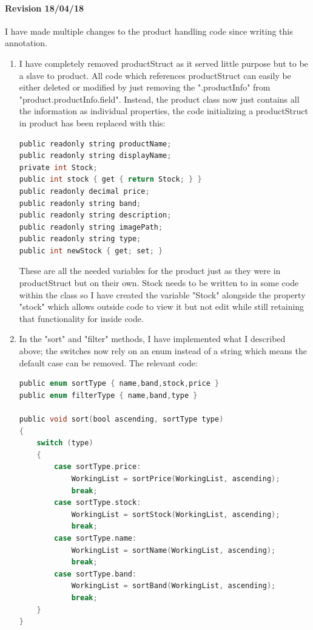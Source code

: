 ﻿\documentclass{article}
\begin{document}
    \paragraph{Revision 18/04/18}
    I have made multiple changes to the product handling code since writing this annotation.
    \begin{enumerate}
        \item I have completely removed productStruct as it served little purpose but to be a slave to product.
        All code which references productStruct can easily be either deleted or modified by just removing the ".productInfo" from "product.productInfo.field".
        Instead, the product class now just contains all the information as individual properties, the code initializing a productStruct in product has been replaced with this:
        \begin{lstlisting}[language=C]
public readonly string productName;
public readonly string displayName;
private int Stock;
public int stock { get { return Stock; } }
public readonly decimal price;
public readonly string band;
public readonly string description;
public readonly string imagePath;
public readonly string type;
public int newStock { get; set; }
        \end{lstlisting}
        These are all the needed variables for the product just as they were in productStruct but on their own.
        Stock needs to be written to in some code within the class so I have created the variable "Stock" alongside the property "stock" which allows outside code to view it but not edit while still retaining that functionality for inside code.
        \item In the "sort" and "filter" methods, I have implemented what I described above; the switches now rely on an enum instead of a string which means the default case can be removed.
        The relevant code:
        \begin{lstlisting}[language=C]
public enum sortType { name,band,stock,price }
public enum filterType { name,band,type }

public void sort(bool ascending, sortType type)
{
    switch (type)
    {
        case sortType.price:
            WorkingList = sortPrice(WorkingList, ascending);
            break;
        case sortType.stock:
            WorkingList = sortStock(WorkingList, ascending);
            break;
        case sortType.name:
            WorkingList = sortName(WorkingList, ascending);
            break;
        case sortType.band:
            WorkingList = sortBand(WorkingList, ascending);
            break;
    }
}


\end{lstlisting}
\end{enumerate}
\end{document}
